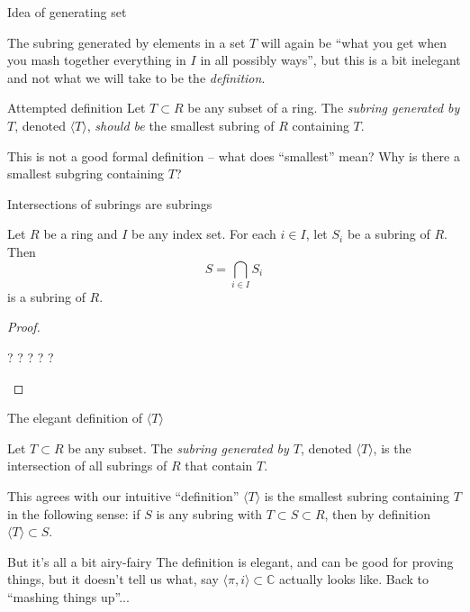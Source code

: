 \documentclass{beamer}
\begin{document}
\begin{frame}{Idea of generating set}

The subring generated by elements in a set $T$ will again be ``what you get when you mash together everything in $I$ in all possibly ways'', but this is a bit inelegant and not what we will take to be the \emph{definition}.


\begin{block}{Attempted definition} Let $T\subset R$ be any subset of a ring.  The \emph{subring generated by $T$}, denoted $\langle T\rangle$, \emph{should be} the smallest subring of $R$ containing $T$.
\end{block}

This is not a good formal definition -- what does ``smallest'' mean?  Why is there a smallest subgring containing $T$? 


\end{frame}

\begin{frame}{Intersections of subrings are subrings}


\begin{lemma} Let $R$ be a ring and $I$ be any index set. For each $i\in I$, let $S_i$ be a subring of $R$.  Then
$$S=\bigcap_{i\in I} S_i$$
is a subring of $R$.

\end{lemma}
\begin{proof} 
\begin{center} ? ? ? ? ? \end{center}
\end{proof}

\end{frame}

\begin{frame}{The elegant definition of $\langle T\rangle$}

\begin{definition} Let $T\subset R$ be any subset.  The \emph{subring generated by $T$}, denoted $\langle T\rangle$, is the intersection of all subrings of $R$ that contain $T$.
\end{definition}

\begin{block}{This agrees with our intuitive ``definition''}
$\langle T\rangle $ is the smallest subring containing $T$ in the following sense: if $S$ is any subring with $T\subset S\subset R$, then by definition $\langle T\rangle \subset S$.
\end{block}

\begin{block}{But it's all a bit airy-fairy}
The definition is elegant, and can be good for proving things, but it doesn't tell us what, say $\langle \pi, i \rangle \subset \mathbb{C}$ actually looks like.  Back to ``mashing things up''...
\end{block}


\end{frame}
\end{document}
